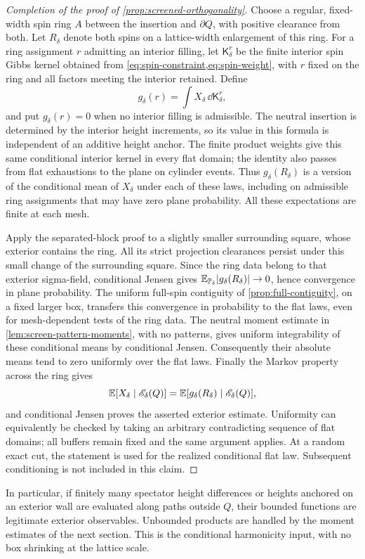 \begin{proof}[Completion of the proof of
\cref{prop:screened-orthogonality}]
Choose a regular, fixed-width spin ring $A$ between the insertion and
$\partial Q$, with positive clearance from both. Let $R_\delta$ denote
both spins on a lattice-width enlargement of this ring. For a ring
assignment $r$ admitting an interior filling, let $\mathsf K_\delta^r$
be the finite interior spin Gibbs kernel obtained from
\cref{eq:spin-constraint,eq:spin-weight}, with $r$ fixed on the ring and
all factors meeting the interior retained. Define
\[
 g_\delta(r)=\int X_\delta\,\dd\mathsf K_\delta^r,
\]
and put $g_\delta(r)=0$ when no interior filling is admissible.
The neutral insertion is determined by the interior height increments,
so its value in this formula is independent of an additive height anchor.
The finite product weights give this same conditional interior kernel in
every flat domain; the identity also passes from flat exhaustions to the
plane on cylinder events. Thus $g_\delta(R_\delta)$ is a version of the
conditional mean of $X_\delta$ under each of these laws, including on
admissible ring assignments that may have zero plane probability. All
these expectations are finite at each mesh.

Apply the separated-block proof to a slightly smaller surrounding square,
whose exterior contains the ring. All its strict projection clearances
persist under this small change of the surrounding square. Since the ring
data belong to that exterior sigma-field, conditional Jensen gives
$\mathbb E_{\mathbb P_\delta}|g_\delta(R_\delta)|\to0$, hence convergence in plane
probability. The uniform full-spin
contiguity of \cref{prop:full-contiguity}, on a fixed larger box,
transfers this convergence in probability to the flat laws, even for
mesh-dependent tests of the ring data. The neutral moment estimate in
\cref{lem:screen-pattern-moments}, with no patterns, gives uniform
integrability of these conditional means by conditional Jensen.
Consequently their absolute means tend to zero uniformly over the
flat laws. Finally the Markov property across the ring gives
\[
 \mathbb E[X_\delta\mid\mathscr E_\delta(Q)]
    =\mathbb E[g_\delta(R_\delta)\mid\mathscr E_\delta(Q)],
\]
and conditional Jensen proves the asserted exterior estimate. Uniformity
can equivalently be checked by taking an arbitrary contradicting
sequence of flat domains; all buffers remain fixed and the same argument
applies. At a random exact cut, the statement is used for the realized
conditional flat law. Subsequent conditioning is not included in this
claim.
\end{proof}

In particular, if finitely many spectator height differences or heights
anchored on an exterior wall are evaluated along paths outside $Q$,
their bounded functions are legitimate exterior observables. Unbounded
products are handled by the moment estimates of the next section. This
is the conditional harmonicity input, with no box shrinking at the
lattice scale.
